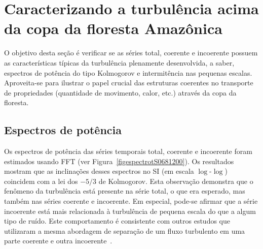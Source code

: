 \section{Caracterizando a turbulência acima da copa da floresta Amazônica}

O objetivo desta seção é verificar se as séries total, coerente e incoerente possuem as características típicas da turbulência plenamente desenvolvida, a saber, espectros de potência do tipo Kolmogorov e intermitência nas pequenas escalas. Aproveita-se para ilustrar o papel crucial das estruturas coerentes no transporte de propriedades (quantidade de movimento, calor, etc.) através da copa da floresta.

\subsection{Espectros de potência}

Os espectros de potência das séries temporais total, coerente e incoerente foram estimados usando FFT (ver Figura~\ref{figespectrotS0681200}). Os resultados mostram que as inclinações desses espectros no SI (em escala $\log$-$\log$) coincidem com a lei dos $-5/3$ de Kolmogorov. Esta observação demonstra que o fenômeno da turbulência está presente na série total, o que era esperado, mas também nas séries coerente e incoerente. Em especial, pode-se afirmar que a série incoerente está mais relacionada à turbulência de pequena escala do que a algum tipo de ruído. Este comportamento é consistente com outros estudos que utilizaram a mesma abordagem de separação de um fluxo turbulento em uma parte coerente e outra incoerente~\cite{farge/01}.


